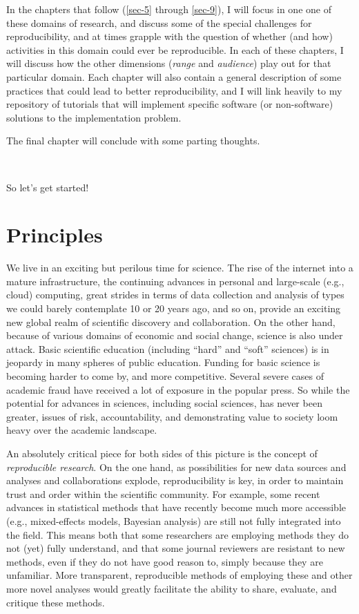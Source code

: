 \documentclass{book}
\begin{document}
In the chapters that follow (\ref{sec-5} through \ref{sec-9}), I will focus in one one of these domains of research, and discuss some of the special challenges for reproducibility, and at times grapple with the question of whether (and how) activities in this domain could ever be reproducible. In each of these chapters, I will discuss how the other dimensions (\emph{range} and \emph{audience}) play out for that particular domain. Each chapter will also contain a general description of some practices that could lead to better reproducibility, and I will link heavily to my repository of tutorials that will implement specific software (or non-software) solutions to the implementation problem.

The final chapter will conclude with some parting thoughts.

~

So let's get started!
\chapter{Principles}
\label{sec-2}
\label{principles}

We live in an exciting but perilous time for science. The rise of the internet into a mature infrastructure, the continuing advances in personal and large-scale (e.g., cloud) computing, great strides in terms of data collection and analysis of types we could barely contemplate 10 or 20 years ago, and so on, provide an exciting new global realm of scientific discovery and collaboration. On the other hand, because of various domains of economic and social change, science is also under attack.  Basic scientific education (including ``hard'' and ``soft'' sciences) is in jeopardy in many spheres of public education.  Funding for basic science is becoming harder to come by, and more competitive.  Several severe cases of academic fraud have received a lot of exposure in the popular press. So while the potential for advances in sciences, including social sciences, has never been greater, issues of risk, accountability, and demonstrating value to society loom heavy over the academic landscape.

An absolutely critical piece for both sides of this picture is the concept of \emph{reproducible research}.  On the one hand, as possibilities for new data sources and analyses and collaborations explode, reproducibility is key, in order to maintain trust and order within the scientific community.  For example, some recent advances in statistical methods that have recently become much more accessible (e.g., mixed-effects models, Bayesian analysis) are still not fully integrated into the field.  This means both that some researchers are employing methods they do not (yet) fully understand, and that some journal reviewers are resistant to new methods, even if they do not have good reason to, simply because they are unfamiliar. More transparent, reproducible methods of employing these and other more novel analyses would greatly facilitate the ability to share, evaluate, and critique these methods.
\end{document}

